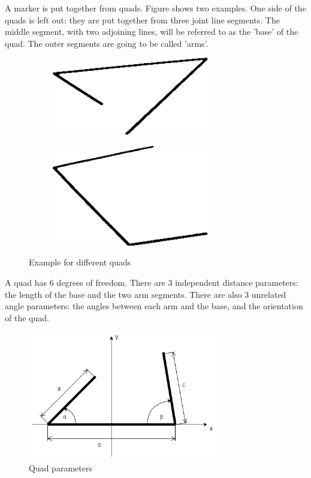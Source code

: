 A marker is put together from quads.
Figure  shows two examples.
One side of the quads is left out: they are put together from three joint line segments.
The middle segment, with two adjoining lines, will be referred to as the 'base' of the quad.
The outer segments are going to be called 'arms'.

\begin{figure}
	\begin{subfigure}{0.5\textwidth}
		\centering
		\includegraphics[width=0.75\textwidth]{figures/quad1.png}
	\end{subfigure}
	\begin{subfigure}{0.5\textwidth}
		\centering
		\includegraphics[width=0.75\textwidth]{figures/quad2.png}
	\end{subfigure}
	\caption{Example for different quads}
	\label{fig:exampleQuads}
\end{figure}

A quad has 6 degrees of freedom.
There are 3 independent distance parameters: the length of the base and the two arm segments.
There are also 3 unrelated angle parameters: the angles between each arm and the base, and the orientation of the quad.

\begin{figure}[ht]
	\centering
	\includegraphics[width=0.75\textwidth]{figures/quad_params.png}
	\caption{Quad parameters}
	\label{fig:quadParams}
\end{figure}


